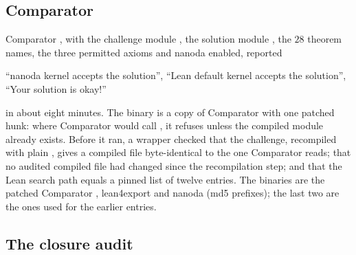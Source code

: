 \documentclass[11pt]{article}
\theoremstyle{definition}
\begin{document}
\subsection{Comparator}\label{sec:comparator}

Comparator \cite{Comparator}, with the challenge module , the solution module , the $28$ theorem names, the three permitted axioms and nanoda enabled, reported
\begin{center}
``nanoda kernel accepts the solution'', \quad ``Lean default kernel accepts the solution'', \quad ``Your solution is okay!''
\end{center}
in about eight minutes. The binary is a copy of Comparator  with one patched hunk: where Comparator would call , it refuses unless the compiled module already exists. Before it ran, a wrapper checked that the challenge, recompiled with plain , gives a compiled file byte-identical to the one Comparator reads; that no audited compiled file had changed since the recompilation step; and that the Lean search path equals a pinned list of twelve entries. The binaries are the patched Comparator , lean4export  and nanoda  (md5 prefixes); the last two are the ones used for the earlier entries.

\subsection{The closure audit}\label{sec:audit}
\end{document}
